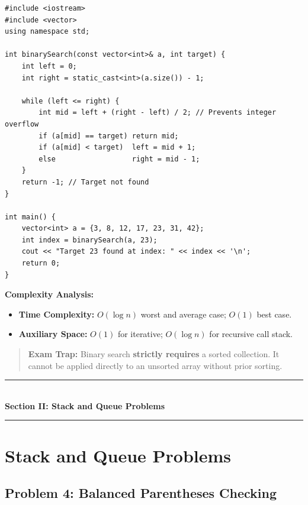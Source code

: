 \begin{lstlisting}[style=cppstyle, caption={C++ Iterative Binary Search.}]
#include <iostream>
#include <vector>
using namespace std;

int binarySearch(const vector<int>& a, int target) {
    int left = 0;
    int right = static_cast<int>(a.size()) - 1;

    while (left <= right) {
        int mid = left + (right - left) / 2; // Prevents integer overflow
        if (a[mid] == target) return mid;
        if (a[mid] < target)  left = mid + 1;
        else                  right = mid - 1;
    }
    return -1; // Target not found
}

int main() {
    vector<int> a = {3, 8, 12, 17, 23, 31, 42};
    int index = binarySearch(a, 23);
    cout << "Target 23 found at index: " << index << '\n';
    return 0;
}
\end{lstlisting}

\textbf{Complexity Analysis:}
\begin{itemize}
    \item \textbf{Time Complexity:} $O(\log n)$ worst and average case; $O(1)$ best case.
    \item \textbf{Auxiliary Space:} $O(1)$ for iterative; $O(\log n)$ for recursive call stack.
\end{itemize}

\begin{quote}
\textbf{Exam Trap:} Binary search \textbf{strictly requires} a sorted collection. It cannot be applied directly to an unsorted array without prior sorting.
\end{quote}

\newpage
\begin{center}
\vspace{0.5em}
{\color{primary}\rule{0.45\textwidth}{1.2pt}}\\[4pt]
{\Large\bfseries\color{primary} Section II: Stack and Queue Problems}\\[2pt]
{\color{primary}\rule{0.45\textwidth}{1.2pt}}
\vspace{0.5em}
\end{center}

\section{Stack and Queue Problems}

\subsection{Problem 4: Balanced Parentheses Checking}

